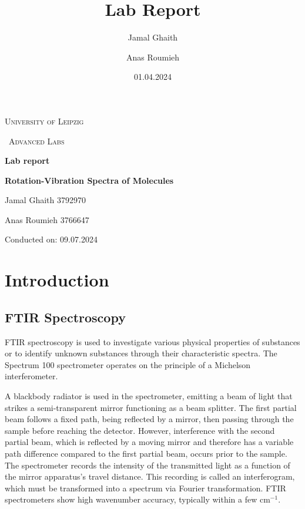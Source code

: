 \documentclass{article}
\title{Lab Report}
\author{Jamal Ghaith}
\author{Anas Roumieh}
\date{01.04.2024}
\begin{document}
\begin{titlepage}
	\centering
	{\scshape\LARGE University of Leipzig \par}
	\vspace{1cm}
	{\scshape\ Advanced Labs\par}
	\vspace{1.5cm}
	{\huge\bfseries Lab report\par}
	\vspace{2cm}
	{\huge\bfseries Rotation-Vibration Spectra of Molecules\par}
	\vspace{2cm}
	{\Large Jamal Ghaith 3792970\par}
    {\Large Anas Roumieh 3766647\par}
	\vfill

    {\Large Conducted on: 09.07.2024 \par}
	\vfill
\end{titlepage}


\tableofcontents
{}
\pagebreak{}

\section{Introduction}

\subsection{FTIR Spectroscopy}

FTIR spectroscopy is used to investigate various physical properties of substances or to identify unknown substances through their characteristic spectra. The Spectrum 100 spectrometer operates on the principle of a Michelson interferometer.

A blackbody radiator is used in the spectrometer, emitting a beam of light that strikes a semi-transparent mirror functioning as a beam splitter. The first partial beam follows a fixed path, being reflected by a mirror, then passing through the sample before reaching the detector. However, interference with the second partial beam, which is reflected by a moving mirror and therefore has a variable path difference compared to the first partial beam, occurs prior to the sample. The spectrometer records the intensity of the transmitted light as a function of the mirror apparatus's travel distance. This recording is called an interferogram, which must be transformed into a spectrum via Fourier transformation. FTIR spectrometers show high wavenumber accuracy, typically within a few cm\(^{-1}\).
\end{document}
